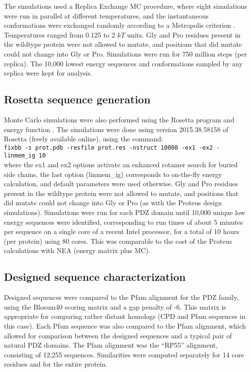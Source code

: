 \documentclass[a4paper,12pt]{article}
\begin{document}
The simulations used a Replica Exchange MC procedure, where eight simulations were run in parallel at different temperatures,
and the instantaneous conformations were exchanged randomly according to a Metropolis criterion \cite{Mignon16}. Temperatures
ranged from 0.125 to 2 $kT$ units. Gly and Pro residues present in the wildtype protein were not allowed to mutate, and positions
that did mutate could not change into Gly or Pro. Simulations were run for 750 million steps (per replica). The 10,000 lowest
energy sequences and conformations sampled by any replica were kept for analysis. 

\subsection{Rosetta sequence generation}
Monte Carlo simulations were also performed using the Rosetta program and energy function \cite{Baker06b}. The simulations
were done using version 2015.38.58158 of Rosetta (freely available online), using the command: \\ \small
\verb~fixbb -s prot.pdb -resfile prot.res -nstruct 10000 -ex1 -ex2 -linmem_ig 10~ \\ \normalsize where the ex1 and ex2 options
activate an enhanced rotamer search for buried side chains, the last option (linmem\_ig) corresponds to on-the-fly energy
calculation, and default parameters were used otherwise. Gly and Pro residues present in the wildtype protein were not
allowed to mutate, and positions that did mutate
could not change into Gly or Pro (as with the Proteus design simulations). Simulations were run for each PDZ domain until
10,000 unique low energy sequences were identified, corresponding to run times of about 5 minutes per sequence on a single
core of a recent Intel processor, for a total of 10 hours (per protein) using 80 cores. This was comparable to the cost of
the Proteus calculations with NEA (energy matrix plus MC).

\subsection{Designed sequence characterization}
Designed sequences were compared to the Pfam alignment for the PDZ family, using the Blosum40 scoring matrix and a
gap penalty of -6. This matrix is appropriate for comparing rather distant homologs (CPD and Pfam sequences in this
case). Each Pfam sequence was also compared to the Pfam alignment, which allowed for comparison between the designed
sequences and a typical pair of natural PDZ domains. The Pfam alignment was the ``RP55'' alignment, consisting of 12,255
sequences. Similarities were computed separately for 14 core residues and for the entire protein.
\end{document}
